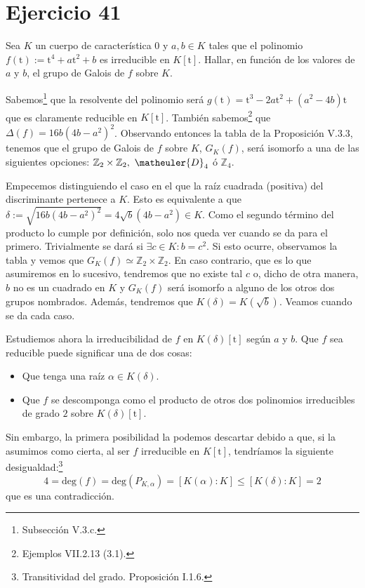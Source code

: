 \section{Ejercicio 41}
\begin{enun}
    Sea $K$ un cuerpo de característica $0$ y $a, b \in K$ tales que el polinomio $f\left( \mathrm{t} \right) := \mathrm{t}^4 + a \mathrm{t}^2 + b$ es irreducible en $K\left[\mathrm{t}\right]$.
    Hallar, en función de los valores de $a$ y $b$, el grupo de Galois de $f$ sobre $K$.
\end{enun}

\begin{sol}
    Sabemos\footnote{Subsección V.3.c\cite{cuerpos}.} que la resolvente del polinomio será $g\left( \mathrm{t} \right) = \mathrm{t}^3 - 2a \mathrm{t}^2 + \left( a^2 - 4b \right)\mathrm{t}$ que es claramente reducible en $K\left[\mathrm{t}\right]$. También sabemos\footnote{Ejemplos VII.2.13 (3.1)\cite{anillos}.} que $\Delta\left( f \right) = 16b\left( 4b - a^2 \right)^2$. Observando entonces la tabla de la Proposición V.3.3\cite{cuerpos}, tenemos que el grupo de Galois de $f$ sobre $K$, $G_K\left( f \right)$, será isomorfo a una de las siguientes opciones: $\mathbb{Z}_2 \times \mathbb{Z}_2,\ \matheuler{D}_4$ ó $\mathbb{Z}_4$.

    Empecemos distinguiendo el caso en el que la raíz cuadrada (positiva) del discriminante pertenece a $K$. Esto es equivalente a que $\delta := \sqrt{16b\left( 4b - a^2 \right)^2} = 4 \sqrt{b} \left( 4b - a^2 \right) \in K$. Como el segundo término del producto lo cumple por definición, solo nos queda ver cuando se da para el primero. Trivialmente se dará si $\exists c \in K : b = c^2$. Si esto ocurre, observamos la tabla y vemos que $\boxed{G_K\left( f \right) \simeq \mathbb{Z}_2 \times \mathbb{Z}_2}$. En caso contrario, que es lo que asumiremos en lo sucesivo, tendremos que no existe tal $c$ o, dicho de otra manera, $b$ no es un cuadrado en $K$ y $G_K\left( f \right)$ será isomorfo a alguno de los otros dos grupos nombrados. Además, tendremos que $K\left( \delta \right) = K\left( \sqrt{b} \right)$. Veamos cuando se da cada caso.

    Estudiemos ahora la irreducibilidad de $f$ en $K\left( \delta \right)\left[ \mathrm{t} \right]$ según $a$ y $b$. Que $f$ sea reducible puede significar una de dos cosas:
    \begin{itemize}
        \item Que tenga una raíz $\alpha \in K\left( \delta \right)$.
        \item Que $f$ se descomponga como el producto de otros dos polinomios irreducibles de grado $2$ sobre $K\left( \delta \right)\left[ \mathrm{t} \right]$.
    \end{itemize}
    Sin embargo, la primera posibilidad la podemos descartar debido a que, si la asumimos como cierta, al ser $f$ irreducible en $K\left[ \mathrm{t} \right]$, tendríamos la siguiente desigualdad:\footnote{Transitividad del grado. Proposición I.1.6\cite{cuerpos}.}
    \[
    4 = \mathrm{deg}\left( f \right) = \mathrm{deg}\left( P_{K, \alpha} \right) = \left[ K\left( \alpha \right) : K \right] \le \left[ K\left( \delta \right) : K \right] = 2
    \]
    que es una contradicción.


\end{sol}
